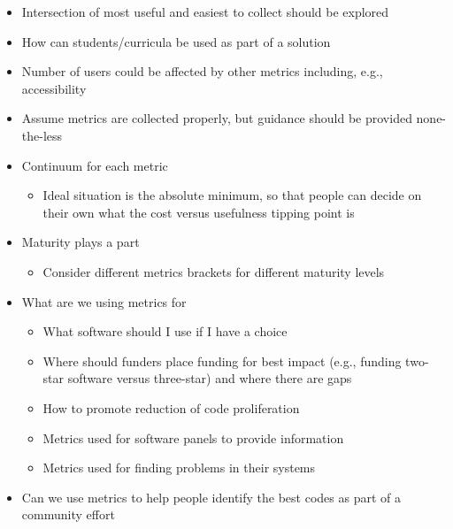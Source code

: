 \begin{itemize}
\item
Intersection of most useful and easiest to collect should be explored

\item
How can students/curricula be used as part of a solution

\item
Number of users could be affected by other metrics including, e.g., accessibility

\item
Assume metrics are collected properly, but guidance should be provided none-the-less

\item
Continuum for each metric

\begin{itemize}
\item
Ideal situation is the absolute minimum, so that people can decide on their own
what the cost versus usefulness tipping point is
        
\end{itemize}

\item
Maturity plays a part

\begin{itemize}
\item
        Consider different metrics brackets for different maturity levels
\end{itemize}

\item
What are we using metrics for

\begin{itemize}
\item
        What software should I use if I have a choice

\item
Where should funders place funding for best impact (e.g., funding two-star
software versus three-star) and where there are gaps

\item
        How to promote reduction of code proliferation

\item
        Metrics used for software panels to provide information

\item
        Metrics used for finding problems in their systems

\end{itemize}

\item
Can we use metrics to help people identify the best codes as part of a community
effort

\end{itemize}

